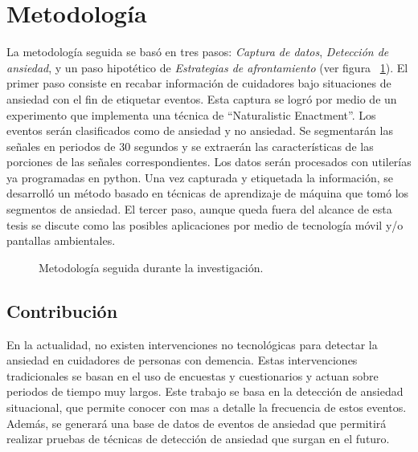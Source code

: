 \section{Metodolog\'ia}\label{secc:methodology}
La metodolog\'ia seguida se bas\'o en tres pasos: \textit{Captura de datos}, \textit{Detecci\'on de ansiedad}, y un paso hipot\'etico de \textit{Estrategias de afrontamiento} (ver figura ~\ref{fig:metodology}). El primer paso consiste en recabar informaci\'on de cuidadores bajo situaciones de ansiedad con el fin de etiquetar eventos. Esta captura se logr\'o por medio de un experimento que implementa una t\'ecnica de ``Naturalistic Enactment''.  Los eventos ser\'an clasificados como de ansiedad y no ansiedad. Se segmentar\'an las se\~nales en periodos de 30 segundos y se extraer\'an las caracter\'isticas de las porciones de las se\~nales correspondientes. Los datos ser\'an procesados con utiler\'ias ya programadas en python. Una vez capturada y etiquetada la informaci\'on, se desarroll\'o un m\'etodo basado en t\'ecnicas de aprendizaje de m\'aquina que tom\'o los segmentos de ansiedad. El tercer paso, aunque queda fuera del alcance de esta tesis se discute como las posibles aplicaciones por medio de tecnolog\'ia m\'ovil y/o pantallas ambientales.
\begin{figure}[h!]
        \centering
        \caption{Metodolog\'ia seguida durante la investigaci\'on.} \label{fig:metodology}
\end{figure}
\subsection{Contribuci\'on}
	En la actualidad, no existen intervenciones no tecnol\'ogicas para detectar la ansiedad en cuidadores de personas con demencia. Estas intervenciones tradicionales se basan en el uso de encuestas y cuestionarios y actuan sobre periodos de tiempo muy largos. Este trabajo se basa en la detecci\'on de ansiedad situacional, que permite conocer con mas a detalle la frecuencia de estos eventos.
	Adem\'as, se generar\'a una base de datos de eventos de ansiedad que permitir\'a realizar pruebas de t\'ecnicas de detecci\'on de ansiedad que surgan en el futuro.
